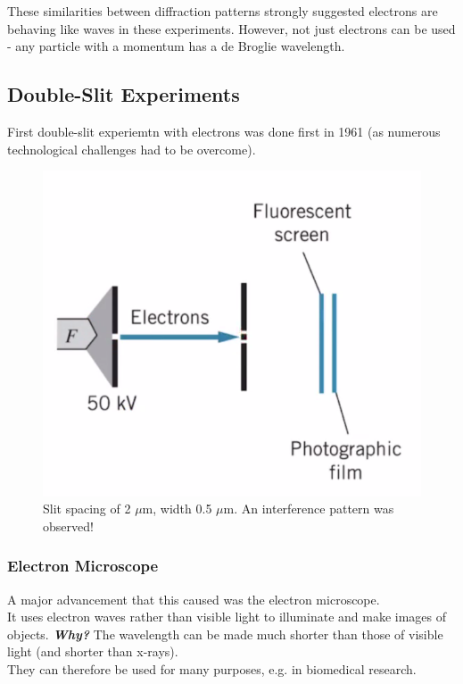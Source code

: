 \documentclass[class=article,crop=false]{standalone}
\begin{document}
These similarities between diffraction patterns strongly suggested electrons are behaving like waves in these experiments. However, not just electrons can be used - any particle with a momentum has a de Broglie wavelength.

\subsection{Double-Slit Experiments}
First double-slit experiemtn with electrons was done first in 1961 (as numerous technological challenges had to be overcome).

\begin{figure}[h!]
	\centering
	\includegraphics[width=.8\linewidth]{./Images/electron_doubleslit.png}
	\caption{Slit spacing of 2 $\mu$m, width 0.5 $\mu$m. An interference pattern was observed!}
\end{figure}

\newpage
\subsubsection{Electron Microscope}

A major advancement that this caused was the electron microscope. \\
It uses electron waves rather than visible light to illuminate and make images of objects. \textbf{\emph{Why?}} The wavelength can be made much shorter than those of visible light (and shorter than x-rays). \\

They can therefore be used for many purposes, e.g. in biomedical research. \\
\end{document}
